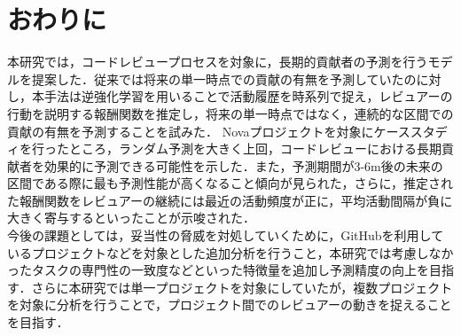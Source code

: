 \documentclass[submit,techrep,noauthor]{ipsj}
\begin{document}
\section{おわりに}
\label{sec:conclusion}
本研究では，コードレビュープロセスを対象に，長期的貢献者の予測を行うモデルを提案した．従来では将来の単一時点での貢献の有無を予測していたのに対し，本手法は逆強化学習を用いることで活動履歴を時系列で捉え，レビュアーの行動を説明する報酬関数を推定し，将来の単一時点ではなく，連続的な区間での貢献の有無を予測することを試みた．
Novaプロジェクトを対象にケーススタディを行ったところ，ランダム予測を大きく上回，コードレビューにおける長期貢献者を効果的に予測できる可能性を示した．また，予測期間が3-6m後の未来の区間である際に最も予測性能が高くなること傾向が見られた，さらに，推定された報酬関数をレビュアーの継続には最近の活動頻度が正に，平均活動間隔が負に大きく寄与するといったことが示唆された．\\
 今後の課題としては，妥当性の脅威を対処していくために，GitHubを利用しているプロジェクトなどを対象とした追加分析を行うこと，本研究では考慮しなかったタスクの専門性の一致度などといった特徴量を追加し予測精度の向上を目指す．さらに本研究では単一プロジェクトを対象にしていたが，複数プロジェクトを対象に分析を行うことで，プロジェクト間でのレビュアーの動きを捉えることを目指す．




\end{document}
